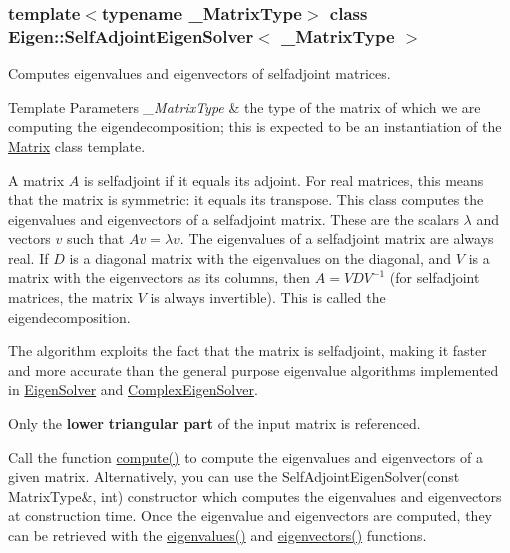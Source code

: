 \subsubsection*{template$<$typename \+\_\+\+Matrix\+Type$>$\newline
class Eigen\+::\+Self\+Adjoint\+Eigen\+Solver$<$ \+\_\+\+Matrix\+Type $>$}

Computes eigenvalues and eigenvectors of selfadjoint matrices. 


\begin{DoxyTemplParams}{Template Parameters}
{\em \+\_\+\+Matrix\+Type} & the type of the matrix of which we are computing the eigendecomposition; this is expected to be an instantiation of the \hyperlink{group___core___module_class_eigen_1_1_matrix}{Matrix} class template.\\
\hline
\end{DoxyTemplParams}
A matrix $ A $ is selfadjoint if it equals its adjoint. For real matrices, this means that the matrix is symmetric\+: it equals its transpose. This class computes the eigenvalues and eigenvectors of a selfadjoint matrix. These are the scalars $ \lambda $ and vectors $ v $ such that $ Av = \lambda v $. The eigenvalues of a selfadjoint matrix are always real. If $ D $ is a diagonal matrix with the eigenvalues on the diagonal, and $ V $ is a matrix with the eigenvectors as its columns, then $ A = V D V^{-1} $ (for selfadjoint matrices, the matrix $ V $ is always invertible). This is called the eigendecomposition.

The algorithm exploits the fact that the matrix is selfadjoint, making it faster and more accurate than the general purpose eigenvalue algorithms implemented in \hyperlink{group___eigenvalues___module_class_eigen_1_1_eigen_solver}{Eigen\+Solver} and \hyperlink{group___eigenvalues___module_class_eigen_1_1_complex_eigen_solver}{Complex\+Eigen\+Solver}.

Only the {\bfseries lower} {\bfseries triangular} {\bfseries part} of the input matrix is referenced.

Call the function \hyperlink{group___eigenvalues___module_a88bcdc24112efa7c4d2ebb3476efcbe9}{compute()} to compute the eigenvalues and eigenvectors of a given matrix. Alternatively, you can use the Self\+Adjoint\+Eigen\+Solver(const Matrix\+Type\&, int) constructor which computes the eigenvalues and eigenvectors at construction time. Once the eigenvalue and eigenvectors are computed, they can be retrieved with the \hyperlink{group___eigenvalues___module_a8efab27e82aa6aa0ae0c64739238c2e0}{eigenvalues()} and \hyperlink{group___eigenvalues___module_a7b9f7e641fa46ac4c5f2371405c69b2b}{eigenvectors()} functions.

